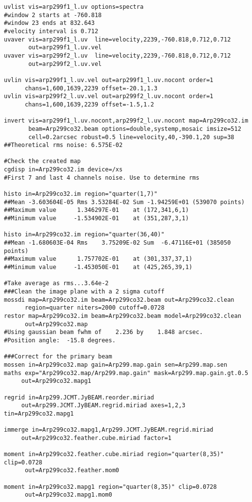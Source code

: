 \begin{verbatim}
uvlist vis=arp299f1_l.uv options=spectra
#window 2 starts at -760.818
#window 23 ends at 832.643
#velocity interval is 0.712
uvaver vis=arp299f1_l.uv  line=velocity,2239,-760.818,0.712,0.712 
       out=arp299f1_l.uv.vel
uvaver vis=arp299f2_l.uv  line=velocity,2239,-760.818,0.712,0.712 
       out=arp299f2_l.uv.vel

uvlin vis=arp299f1_l.uv.vel out=arp299f1_l.uv.nocont order=1 
      chans=1,600,1639,2239 offset=-20.1,1.3
uvlin vis=arp299f2_l.uv.vel out=arp299f2_l.uv.nocont order=1 
      chans=1,600,1639,2239 offset=-1.5,1.2

invert vis=arp299f1_l.uv.nocont,arp299f2_l.uv.nocont map=Arp299co32.im 
       beam=Arp299co32.beam options=double,systemp,mosaic imsize=512 
       cell=0.2arcsec robust=0.5 line=velocity,40,-390.1,20 sup=38
##Theoretical rms noise: 6.575E-02

#Check the created map
cgdisp in=Arp299co32.im device=/xs
#First 7 and last 4 channels noise. Use to determine rms

histo in=Arp299co32.im region="quarter(1,7)"
##Mean -3.603604E-05 Rms 3.53284E-02 Sum -1.94259E+01 (539070 points)
##Maximum value      1.346297E-01    at (172,341,6,1)
##Minimum value     -1.534902E-01    at (351,287,3,1)

histo in=Arp299co32.im region="quarter(36,40)"
##Mean -1.680603E-04 Rms    3.75209E-02 Sum  -6.47116E+01 (385050 points)
##Maximum value      1.757702E-01    at (301,337,37,1)
##Minimum value     -1.453050E-01    at (425,265,39,1)

#Take average as rms...3.64e-2
###Clean the image plane with a 2 sigma cutoff
mossdi map=Arp299co32.im beam=Arp299co32.beam out=Arp299co32.clean 
      region=quarter niters=2000 cutoff=0.0728
restor map=Arp299co32.im beam=Arp299co32.beam model=Arp299co32.clean 
      out=Arp299co32.map
#Using gaussian beam fwhm of    2.236 by    1.848 arcsec.
#Position angle:  -15.8 degrees.

###Correct for the primary beam
mossen in=Arp299co32.map gain=Arp299.map.gain sen=Arp299.map.sen
maths exp="Arp299co32.map/Arp299.map.gain" mask=Arp299.map.gain.gt.0.5 
     out=Arp299co32.mapg1

regrid in=Arp299.JCMT.JyBEAM.reorder.miriad 
     out=Arp299.JCMT.JyBEAM.regrid.miriad axes=1,2,3 tin=Arp299co32.mapg1

immerge in=Arp299co32.mapg1,Arp299.JCMT.JyBEAM.regrid.miriad 
     out=Arp299co32.feather.cube.miriad factor=1

moment in=Arp299co32.feather.cube.miriad region="quarter(8,35)" clip=0.0728 
      out=Arp299co32.feather.mom0

moment in=Arp299co32.mapg1 region="quarter(8,35)" clip=0.0728 
      out=Arp299co32.mapg1.mom0
\end{verbatim}

